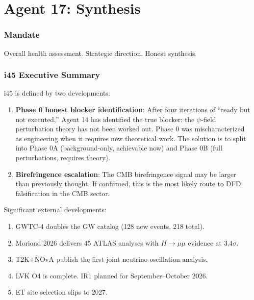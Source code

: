 \documentclass[11pt,a4paper]{article}
\begin{document}
\part{Agent 17: Synthesis}
\label{part:agent17}

\section{Mandate}

Overall health assessment. Strategic direction. Honest synthesis.

\section{i45 Executive Summary}

\begin{tcolorbox}[colback=yellow!5!white, colframe=yellow!60!black,
  title={i45: The Phase 0 Reckoning Iteration}]

i45 is defined by two developments:
\begin{enumerate}
\item \textbf{Phase 0 honest blocker identification}: After four iterations of ``ready but not executed,'' Agent 14 has identified the true blocker: the $\psi$-field perturbation theory has not been worked out. Phase 0 was mischaracterized as engineering when it requires new theoretical work. The solution is to split into Phase 0A (background-only, achievable now) and Phase 0B (full perturbations, requires theory).
\item \textbf{Birefringence escalation}: The CMB birefringence signal may be larger than previously thought. If confirmed, this is the most likely route to DFD falsification in the CMB sector.
\end{enumerate}

Significant external developments:
\begin{enumerate}
\item GWTC-4 doubles the GW catalog (128 new events, 218 total).
\item Moriond 2026 delivers 45 ATLAS analyses with $H \to \mu\mu$ evidence at $3.4\sigma$.
\item T2K+NOvA publish the first joint neutrino oscillation analysis.
\item LVK O4 is complete. IR1 planned for September--October 2026.
\item ET site selection slips to 2027.
\end{enumerate}
\end{tcolorbox}
\end{document}
